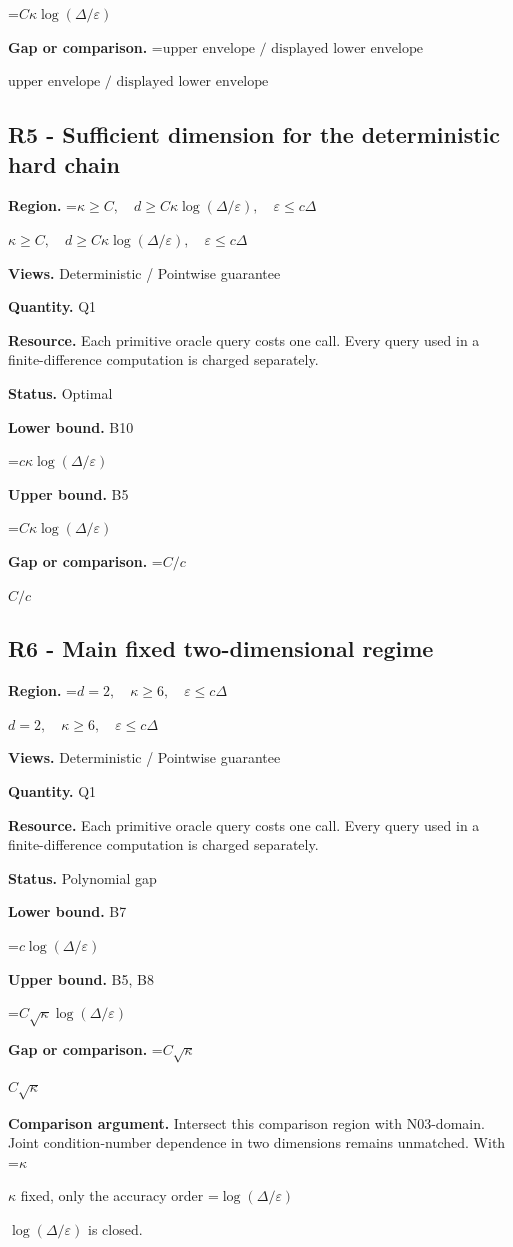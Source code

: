 \documentclass[10pt,a4paper]{article}
\newcommand{\AtlasMath}[1]{\par\begingroup\centering\setbox0=\hbox{$\displaystyle #1$}\ifdim\wd0>1.4\linewidth\typeout{ATLAS WIDE FORMULA: \the\wd0}\fi\ifdim\wd0>\linewidth\resizebox{\linewidth}{!}{\box0}\else\box0\fi\par\endgroup}
\newcommand{\AtlasInlineMath}[1]{\begingroup\setbox0=\hbox{$#1$}\ifdim\wd0>.4\linewidth\endgroup\AtlasMath{#1}\else\endgroup$#1$\fi}
\begin{document}
\AtlasMath{C\kappa\log(\Delta/\varepsilon)}
\textbf{Gap or comparison.} \AtlasInlineMath{\text{upper envelope / displayed lower envelope}}

\subsection{R5 - Sufficient dimension for the deterministic hard chain}
\textbf{Region.} \AtlasInlineMath{\kappa\ge C,\quad d\ge C\kappa\log(\Delta/\varepsilon),\quad\varepsilon\le c\Delta}

\textbf{Views.} Deterministic / Pointwise guarantee

\textbf{Quantity.} Q1

\textbf{Resource.} Each primitive oracle query costs one call. Every query used in a finite-difference computation is charged separately.

\textbf{Status.} Optimal

\textbf{Lower bound.} B10

\AtlasMath{c\kappa\log(\Delta/\varepsilon)}
\textbf{Upper bound.} B5

\AtlasMath{C\kappa\log(\Delta/\varepsilon)}
\textbf{Gap or comparison.} \AtlasInlineMath{C/c}

\subsection{R6 - Main fixed two-dimensional regime}
\textbf{Region.} \AtlasInlineMath{d=2,\quad\kappa\ge6,\quad\varepsilon\le c\Delta}

\textbf{Views.} Deterministic / Pointwise guarantee

\textbf{Quantity.} Q1

\textbf{Resource.} Each primitive oracle query costs one call. Every query used in a finite-difference computation is charged separately.

\textbf{Status.} Polynomial gap

\textbf{Lower bound.} B7

\AtlasMath{c\log(\Delta/\varepsilon)}
\textbf{Upper bound.} B5, B8

\AtlasMath{C\sqrt\kappa\log(\Delta/\varepsilon)}
\textbf{Gap or comparison.} \AtlasInlineMath{C\sqrt\kappa}

\textbf{Comparison argument.} Intersect this comparison region with N03-domain. Joint condition-number dependence in two dimensions remains unmatched. With \AtlasInlineMath{\kappa} fixed, only the accuracy order \AtlasInlineMath{\log(\Delta/\varepsilon)} is closed.
\end{document}
